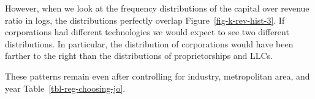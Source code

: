 \documentclass[
  12pt]{article}
\theoremstyle{definition}
\theoremstyle{remark}
\begin{document}
However, when we look at the frequency distributions of the capital over
revenue ratio in logs, the distributions perfectly overlap
Figure~\ref{fig-k-rev-hist-3}. If corporations had different
technologies we would expect to see two different distributions. In
particular, the distribution of corporations would have been farther to
the right than the distributions of proprietorships and LLCs.

These patterns remain even after controlling for industry, metropolitan
area, and year Table~\ref{tbl-reg-choosing-jo}.

\begin{figure}

\begin{minipage}{0.50\linewidth}



\end{minipage}%
%
\begin{minipage}{0.50\linewidth}

\end{minipage}
\end{figure}
\end{document}
